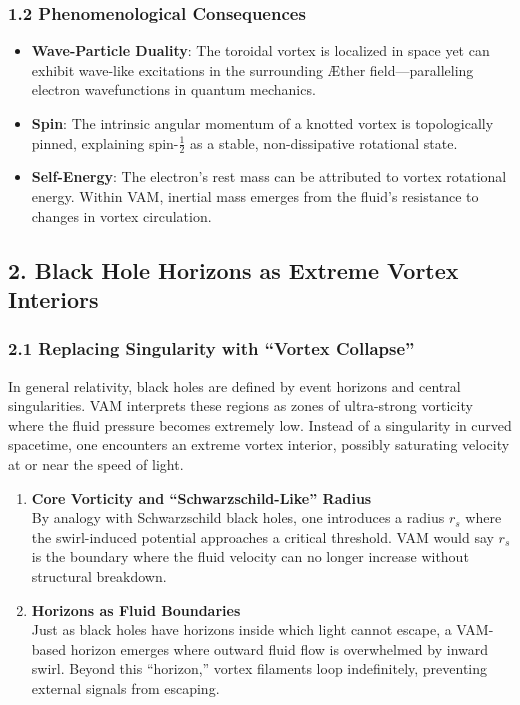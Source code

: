 \documentclass[aps,preprint,superscriptaddress]{revtex4-2}
\begin{document}
    \subsubsection*{1.2 Phenomenological Consequences}
    \begin{itemize}
        \item \textbf{Wave-Particle Duality}: The toroidal vortex is localized in space yet can exhibit wave-like excitations in the surrounding Æther field—paralleling electron wavefunctions in quantum mechanics.
        \item \textbf{Spin}: The intrinsic angular momentum of a knotted vortex is topologically pinned, explaining spin-\(\tfrac{1}{2}\) as a stable, non-dissipative rotational state.
        \item \textbf{Self-Energy}: The electron’s rest mass can be attributed to vortex rotational energy. Within VAM, inertial mass emerges from the fluid’s resistance to changes in vortex circulation.
    \end{itemize}

    \subsection*{2. Black Hole Horizons as Extreme Vortex Interiors}

    \subsubsection*{2.1 Replacing Singularity with “Vortex Collapse”}
    In general relativity, black holes are defined by event horizons and central singularities. VAM interprets these regions as zones of ultra-strong vorticity where the fluid pressure becomes extremely low. Instead of a singularity in curved spacetime, one encounters an extreme vortex interior, possibly saturating velocity at or near the speed of light.

    \begin{enumerate}
        \item \textbf{Core Vorticity and “Schwarzschild-Like” Radius} \\
    By analogy with Schwarzschild black holes, one introduces a radius \(r_s\) where the swirl-induced potential approaches a critical threshold. VAM would say \(r_s\) is the boundary where the fluid velocity can no longer increase without structural breakdown.
        \item \textbf{Horizons as Fluid Boundaries} \\
    Just as black holes have horizons inside which light cannot escape, a VAM-based horizon emerges where outward fluid flow is overwhelmed by inward swirl. Beyond this “horizon,” vortex filaments loop indefinitely, preventing external signals from escaping.
    \end{enumerate}
\end{document}
